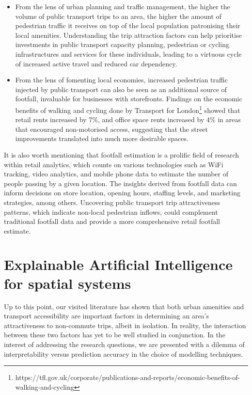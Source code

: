 \begin{itemize}
    \setlength\itemsep{0em}
    \item From the lens of urban planning and traffic management, the higher the volume of public transport trips to an area, the higher the amount of pedestrian traffic it receives on top of the local population patronising their local amenities. Understanding the trip attraction factors can help prioritise investments in public transport capacity planning, pedestrian or cycling infrastructures and services for these individuals, leading to a virtuous cycle of increased active travel and reduced car dependency.
    \item From the lens of fomenting local economies, increased pedestrian traffic injected by public transport can also be seen as an additional source of footfall, invaluable for businesses with storefronts. Findings on the economic benefits of walking and cycling done by Transport for London\footnote{https://tfl.gov.uk/corporate/publications-and-reports/economic-benefits-of-walking-and-cycling} showed that retail rents increased by 7\%, and office space rents increased by 4\% in areas that encouraged non-motorised access, suggesting that the street improvements translated into much more desirable spaces.
\end{itemize}

It is also worth mentioning that footfall estimation is a prolific field of research within retail analytics, which counts on various technologies such as WiFi tracking, video analytics, and mobile phone data to estimate the number of people passing by a given location. The insights derived from footfall data can inform decisions on store location, opening hours, staffing levels, and marketing strategies, among others. Uncovering public transport trip attractiveness patterns, which indicate non-local pedestrian inflows, could complement traditional footfall data and provide a more comprehensive retail footfall estimate.

\section{Explainable Artificial Intelligence for spatial systems}

Up to this point, our visited literature has shown that both urban amenities and transport accessibility are important factors in determining an area's attractiveness to non-commute trips, albeit in isolation. In reality, the interaction between these two factors has yet to be well studied in conjunction. In the interest of addressing the research questions, we are presented with a dilemma of interpretability versus prediction accuracy in the choice of modelling techniques.

